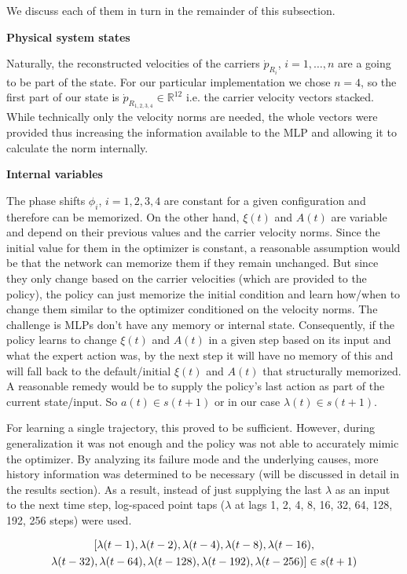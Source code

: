 We discuss each of them in turn in the remainder of this subsection.

\noindent\textbf{Physical system states}

Naturally, the reconstructed velocities of the carriers $\dot{p}_{R_i}$,
$i = 1, \dots, n$ are a going to be part of the state. For our
particular implementation we chose $n = 4$, so the first part of our
state is $\dot{p}_{R_{1,2,3,4}} \in \mathbb{R}^{12}$ i.e. the carrier
velocity vectors stacked. While technically only the velocity norms are
needed, the whole vectors were provided thus increasing the information
available to the MLP and allowing it to calculate the norm internally.

\noindent\textbf{Internal variables}

The phase shifts $\phi_i$, $i = 1,2,3,4$ are constant for a given
configuration and therefore can be memorized. On the other hand,
$\xi(t)$ and $A(t)$ are variable and depend on their previous values and
the carrier velocity norms. Since the initial value for them in the
optimizer is constant, a reasonable assumption would be that the network
can memorize them if they remain unchanged. But since they only change
based on the carrier velocities (which are provided to the policy), the
policy can just memorize the initial condition and learn how/when to change
them
similar to the optimizer conditioned on the velocity norms. The
challenge is MLPs don’t have any memory or internal state. Consequently,
if the policy learns to change $\xi(t)$ and $A(t)$ in a given step based
on its input and what the expert action was, by the next step it will
have no memory of this and will fall back to the default/initial
$\xi(t)$ and $A(t)$ that structurally memorized. A reasonable remedy
would be to supply the policy’s last action as part of the current
state/input. So $a(t) \in s(t+1)$ or in our case $\lambda(t) \in
s(t+1)$.

For learning a single trajectory, this proved to be sufficient. However,
during generalization it was not enough and the policy was not able to
accurately mimic the optimizer. By analyzing its failure mode and the
underlying causes, more history information was determined to be
necessary (will be discussed in detail in the results section). As a
result, instead of just supplying the last $\lambda$ as an input to the
next time step, log-spaced point taps ($\lambda$ at lags 1, 2, 4, 8, 16,
32, 64, 128, 192, 256 steps) were used.

\begin{equation}
  \begin{gathered}
    \relax[\lambda(t-1), \lambda(t-2), \lambda(t-4), \lambda(t-8), \lambda(t-16), \\
     \lambda(t-32), \lambda(t-64), \lambda(t-128), \lambda(t-192), \lambda(t-256)] \in s(t+1)
  \end{gathered}
  \label{eq:log-spaced-taps}
\end{equation}

